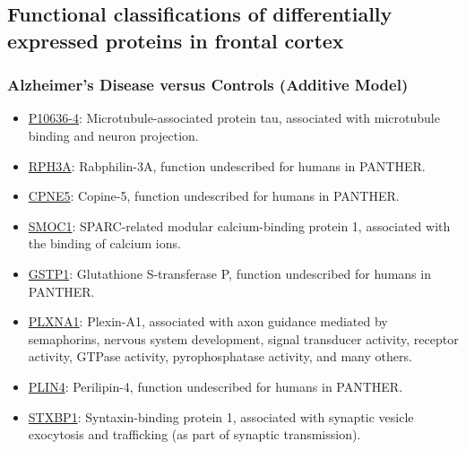 \subsection{Functional classifications of differentially expressed proteins in frontal cortex}
\label{subsec:funct-class-diff}


\subsubsection{Alzheimer's Disease versus Controls (Additive Model)}

\begin{itemize}
\item \href{http://www.pantherdb.org/genes/gene.do?acc=HUMAN\%7CHGNC\%3D6893\%7CUniProtKB\%3DP10636}{P10636-4}: Microtubule-associated protein tau, associated with microtubule binding and neuron projection.
\item \href{http://www.pantherdb.org/genes/gene.do?acc=HUMAN\%7CHGNC\%3D17056\%7CUniProtKB\%3DQ9Y2J0}{RPH3A}: Rabphilin-3A, function undescribed for humans in PANTHER.
\item \href{http://www.pantherdb.org/genes/gene.do?acc=HUMAN\%7CHGNC\%3D2318\%7CUniProtKB\%3DQ9HCH3}{CPNE5}: Copine-5, function undescribed for humans in PANTHER.
\item \href{http://www.pantherdb.org/genes/gene.do?acc=HUMAN\%7CHGNC\%3D20318\%7CUniProtKB\%3DQ9H4F8}{SMOC1}: SPARC-related modular calcium-binding protein 1, associated with the binding of calcium ions.
\item \href{http://www.pantherdb.org/genes/gene.do?acc=HUMAN\%7CHGNC\%3D4638\%7CUniProtKB\%3DP09211}{GSTP1}: Glutathione S-transferase P, function undescribed for humans in PANTHER.
\item \href{http://www.pantherdb.org/genes/gene.do?acc=HUMAN\%7CHGNC\%3D9099\%7CUniProtKB\%3DQ9UIW2}{PLXNA1}: Plexin-A1, associated with axon guidance mediated by semaphorins, nervous system development, signal transducer activity, receptor activity, GTPase activity, pyrophosphatase activity, and many others.
\item \href{http://www.pantherdb.org/genes/gene.do?acc=HUMAN\%7CHGNC\%3D29393\%7CUniProtKB\%3DQ96Q06}{PLIN4}: Perilipin-4, function undescribed for humans in PANTHER.
\item \href{http://www.pantherdb.org/genes/gene.do?acc=HUMAN\%7CHGNC\%3D11444\%7CUniProtKB\%3DP61764}{STXBP1}: Syntaxin-binding protein 1, associated with synaptic vesicle exocytosis and trafficking (as part of synaptic transmission).

\end{itemize}
